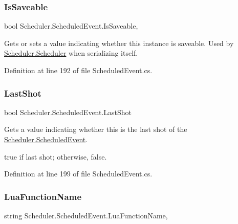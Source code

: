 \subsubsection{\texorpdfstring{Is\+Saveable}{IsSaveable}}
{\footnotesize\ttfamily bool Scheduler.\+Scheduled\+Event.\+Is\+Saveable\hspace{0.3cm}{\ttfamily [get]}, {\ttfamily [set]}}



Gets or sets a value indicating whether this instance is saveable. Used by \hyperlink{class_scheduler_1_1_scheduler}{Scheduler.\+Scheduler} when serializing itself. 



Definition at line 192 of file Scheduled\+Event.\+cs.

\mbox{\label{class_scheduler_1_1_scheduled_event_a1cb36619ff2480679def8c5d3a2770e8}} 
\subsubsection{\texorpdfstring{Last\+Shot}{LastShot}}
{\footnotesize\ttfamily bool Scheduler.\+Scheduled\+Event.\+Last\+Shot\hspace{0.3cm}{\ttfamily [get]}}



Gets a value indicating whether this is the last shot of the \hyperlink{class_scheduler_1_1_scheduled_event}{Scheduler.\+Scheduled\+Event}. 

{\ttfamily true} if last shot; otherwise, {\ttfamily false}.

Definition at line 199 of file Scheduled\+Event.\+cs.

\mbox{\label{class_scheduler_1_1_scheduled_event_a9d7fd8c8658907874ed2e18311e46d38}} 
\subsubsection{\texorpdfstring{Lua\+Function\+Name}{LuaFunctionName}}
{\footnotesize\ttfamily string Scheduler.\+Scheduled\+Event.\+Lua\+Function\+Name\hspace{0.3cm}{\ttfamily [get]}, {}}



